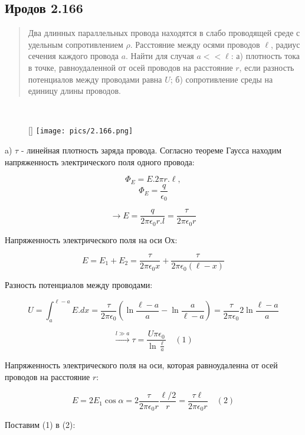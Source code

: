 \subsection*{Иродов 2.166}

\setcounter{equation}{0}

\begin{abstract}
Два длинных параллельных провода находятся в слабо проводящей среде с удельным сопротивлением $\rho$. Расстояние между осями проводов $\ell$, радиус сечения каждого провода $a$. Найти для случая $a << \ell$:
а) плотность тока в точке, равноудаленной от осей проводов на расстояние $r$, если разность потенциалов между проводами равна $U$;
б) сопротивление среды на единицу длины проводов.
\end{abstract}

\noindent \hrulefill
\\
\begin{wrapfigure}[6]{r}{0.30\textwidth}
	\raisebox{0pt}[\dimexpr{}\baselineskip\relax]{
	\texttt{[image: pics/2.166.png]}}
\end{wrapfigure}

a) $\tau$ - линейная плотность заряда провода. Согласно теореме Гаусса находим напряженность электрического поля одного провода:

$$\Phi_{E} = E. 2 \pi r . \ell,$$
$$\Phi_{E} = \frac{q}{\epsilon_0}$$

$$\xrightarrow{} E = \frac{q}{2 \pi \epsilon_0 r . l} = \frac{\tau}{2 \pi \epsilon_0 r}$$

Напряженность электрического поля на оси Ох:

$$E = E_1 + E_2 = \frac{\tau}{2 \pi \epsilon_0 x} + \frac{\tau}{2 \pi \epsilon_0 (\ell -x)}$$

Разность потенциалов между проводами:

$$U = \displaystyle \int_{a}^{\ell -a } E.dx = \frac{\tau}{2 \pi \epsilon_0}(\ln{\frac{\ell -a}{a} }- \ln{\frac{a}{\ell -a}}) = \frac{\tau}{2 \pi \epsilon_0}2\ln{\frac{\ell -a}{a} } $$

$$\xrightarrow{l \gg a} \tau = \frac{U \pi \epsilon_0}{\ln{\frac{\ell}{a}}} \quad (1)$$

Напряженность электрического поля на оси, которая равноудаленна от осей проводов на расстояние $r$: 

$$E = 2E_1 \cos{\alpha} = 2 \frac{\tau}{2 \pi \epsilon_0 r} \frac{\ell /2}{r} = \frac{\tau \ell}{2 \pi \epsilon_0 r} \quad (2)$$

Поставим (1) в (2):

